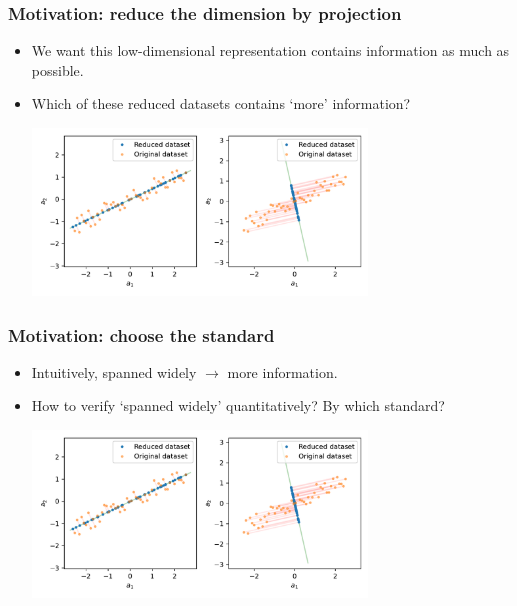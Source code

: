 \documentclass[serif]{beamer}
\begin{document}
\begin{frame}
    \frametitle{Motivation: reduce the dimension by projection}
    \begin{itemize}
        \item We want this low-dimensional representation contains information as much as possible.
        \item Which of these reduced datasets contains `more' information?
        \begin{center}
            \includegraphics[width=3.5in]{./proj12.pdf}
        \end{center}
    \end{itemize}
\end{frame}

\begin{frame}
    \frametitle{Motivation: choose the standard}
    \begin{itemize}
        \item Intuitively, spanned widely $\rightarrow$ more information.
        \item How to verify `spanned widely' \alert{quantitatively}? By which standard?
        \begin{center}
            \includegraphics[width=3.5in]{./proj12.pdf}
        \end{center}
    \end{itemize}
\end{frame}
\end{document}
